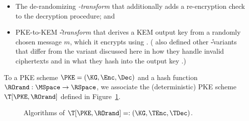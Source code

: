 	\begin{itemize}
		\item
			The de-randomizing \emph{\T-transform} that additionally adds a re-encryption check to the decryption procedure;
			and 
		\item
			PKE-to-KEM \emph{\U-transform} that derives a KEM output key \KEMoutputKey
			from a randomly chosen message $m$, which it encrypts using \PKE.
			(\cite{TCC:HofHovKil17} also defined other \U-variants that differ from the variant discussed here
			in how they handle invalid ciphertexts and in what they hash into the output key \KEMoutputKey.)
	\end{itemize} 
	
	

	\begin{definition}[\T-transform]
		To a PKE scheme $\PKE = (\KG, \Enc, \Dec)$ and a hash function $\ROrand:\MSpace \rightarrow \RSpace$,
		we associate the (deterministic) PKE scheme $\T[\PKE, \ROrand]$ defined in Figure~\ref{fig:def:T-transform}.
		
		\begin{figure}[t]
			\begin{center}
			\end{center}
			\caption{Algorithms of $\T[\PKE, \ROrand]=: (\KG, \TEnc, \TDec)$.}
			\label{fig:def:T-transform}
		\end{figure}
		
	\end{definition}

